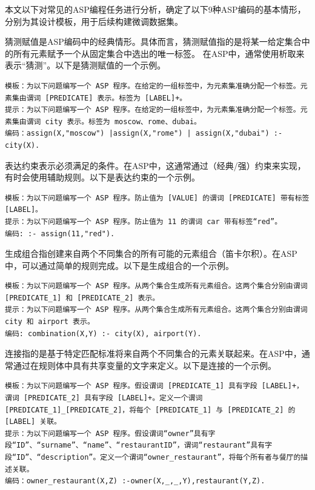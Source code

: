 本文以下对常见的ASP编程任务进行分析，确定了以下9种ASP编码的基本情形，分别为其设计模板，用于后续构建微调数据集。

猜测赋值是ASP编码中的经典情形。具体而言，猜测赋值指的是将某一给定集合中的所有元素赋予一个从固定集合中选出的唯一标签。
在ASP中，通常使用析取来表示“猜测”。以下是猜测赋值的一个示例。
\begin{lstlisting}
模板：为以下问题编写一个 ASP 程序。在给定的一组标签中，为元素集准确分配一个标签。元素集由谓词 [PREDICATE] 表示。标签为 [LABEL]+。
提示：为以下问题编写一个 ASP 程序。在给定的一组标签中，为元素集准确分配一个标签。元素集由谓词 city 表示。标签为 moscow、rome、dubai。
编码：assign(X,"moscow") |assign(X,"rome") | assign(X,"dubai") :- city(X).
\end{lstlisting}

表达约束表示必须满足的条件。在ASP中，这通常通过（经典/强）约束来实现，有时会使用辅助规则。以下是表达约束的一个示例。
\begin{lstlisting}
模板：为以下问题编写一个 ASP 程序。防止值为 [VALUE] 的谓词 [PREDICATE] 带有标签 [LABEL]。
提示：为以下问题编写一个 ASP 程序。防止值为 11 的谓词 car 带有标签“red”。
编码: :- assign(11,"red").
\end{lstlisting}

生成组合指创建来自两个不同集合的所有可能的元素组合（笛卡尔积）。在ASP中，可以通过简单的规则完成。以下是生成组合的一个示例。
\begin{lstlisting}
模板：为以下问题编写一个 ASP 程序。从两个集合生成所有元素组合。这两个集合分别由谓词 [PREDICATE_1] 和 [PREDICATE_2] 表示。
提示：为以下问题编写一个 ASP 程序。从两个集合生成所有元素组合。这两个集合分别由谓词 city 和 airport 表示。
编码: combination(X,Y) :- city(X), airport(Y).
\end{lstlisting}

连接指的是基于特定匹配标准将来自两个不同集合的元素关联起来。在ASP中，通常通过在规则体中具有共享变量的文字来定义。以下是连接的一个示例。
\begin{lstlisting}
模板：为以下问题编写一个 ASP 程序。假设谓词 [PREDICATE_1] 具有字段 [LABEL]+，谓词 [PREDICATE_2] 具有字段 [LABEL]+。定义一个谓词 [PREDICATE_1]_[PREDICATE_2]，将每个 [PREDICATE_1] 与 [PREDICATE_2] 的 [LABEL] 关联。
提示：为以下问题编写一个 ASP 程序。假设谓词“owner”具有字段“ID”、“surname”、“name”、“restaurantID”，谓词“restaurant”具有字段“ID”、“description”。定义一个谓词“owner_restaurant”，将每个所有者与餐厅的描述关联。
编码：owner_restaurant(X,Z) :-owner(X,_,_,Y),restaurant(Y,Z).
\end{lstlisting}

